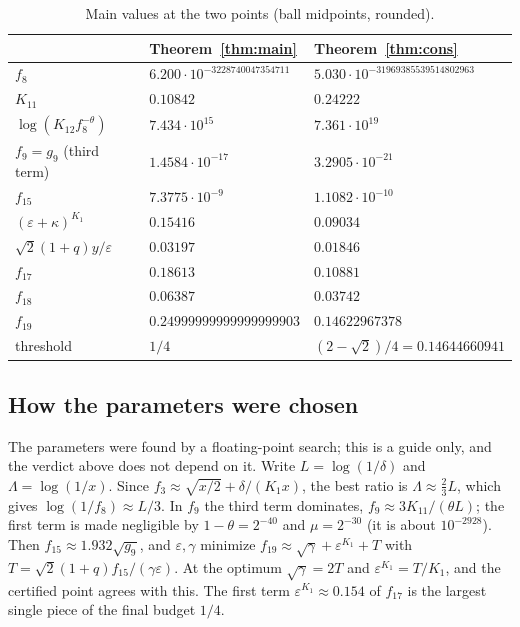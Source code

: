 \documentclass[11pt]{amsart}
\theoremstyle{remark}
\theoremstyle{plain}
\newcommand{\eps}{\varepsilon}
\begin{document}
\begin{table}[ht]
\centering
\caption{Main values at the two points (ball midpoints, rounded).}\label{tab:values}
\begin{tabular}{lll}
\toprule
& Theorem~\ref{thm:main} & Theorem~\ref{thm:cons}\\
\midrule
$f_8$ & $6.200\cdot10^{-3228740047354711}$ & $5.030\cdot10^{-31969385539514802963}$\\
$K_{11}$ & $0.10842$ & $0.24222$\\
$\log(K_{12}f_8^{-\theta})$ & $7.434\cdot10^{15}$ & $7.361\cdot10^{19}$\\
$f_9=g_9$ (third term) & $1.4584\cdot10^{-17}$ & $3.2905\cdot10^{-21}$\\
$f_{15}$ & $7.3775\cdot10^{-9}$ & $1.1082\cdot10^{-10}$\\
$(\eps+\kappa)^{K_1}$ & $0.15416$ & $0.09034$\\
$\sqrt2(1+q)y/\eps$ & $0.03197$ & $0.01846$\\
$f_{17}$ & $0.18613$ & $0.10881$\\
$f_{18}$ & $0.06387$ & $0.03742$\\
$f_{19}$ & $0.24999999999999999903$ & $0.14622967378$\\
threshold & $1/4$ & $(2-\sqrt2)/4=0.14644660941$\\
\bottomrule
\end{tabular}
\end{table}

\subsection*{How the parameters were chosen}
The parameters were found by a floating-point search; this is a guide only, and the verdict above does not depend on it. Write $L=\log(1/\delta)$ and $\Lambda=\log(1/x)$. Since $f_3\approx\sqrt{x/2}+\delta/(K_1x)$, the best ratio is $\Lambda\approx\frac23L$, which gives $\log(1/f_8)\approx L/3$. In $f_9$ the third term dominates, $f_9\approx3K_{11}/(\theta L)$; the first term is made negligible by $1-\theta=2^{-40}$ and $\mu=2^{-30}$ (it is about $10^{-2928}$). Then $f_{15}\approx1.932\sqrt{g_9}$, and $\eps,\gamma$ minimize $f_{19}\approx\sqrt\gamma+\eps^{K_1}+T$ with $T=\sqrt2(1+q)f_{15}/(\gamma\eps)$. At the optimum $\sqrt\gamma=2T$ and $\eps^{K_1}=T/K_1$, and the certified point agrees with this. The first term $\eps^{K_1}\approx0.154$ of $f_{17}$ is the largest single piece of the final budget $1/4$.

\end{document}
